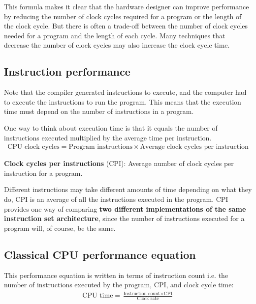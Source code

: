 \documentclass[10pt,a4paper]{article}
\begin{document}
This formula makes it clear that the hardware designer can improve performance by reducing the
number of clock cycles required for a program or the length of the clock cycle. But there is often a
trade-off between the number of clock cycles needed for a program and the length of each cycle. Many
techniques that decrease the number of clock cycles may also increase the clock cycle time.

\subsection{Instruction performance}

Note that the compiler generated instructions to execute, and the computer had to execute the
instructions to run the program. This means that the execution time must depend on the number of
instructions in a program. 

One way to think about execution time is that it equals the number of instructions executed
multiplied by the average time per instruction.
\begin{align*}
    \text{CPU clock cycles} = \text{Program instructions} \times \text{Average clock cycles per instruction}
\end{align*} 

\begin{tcolorbox}[breakable,colback=white]
    \textbf{Clock cycles per instructions} (CPI): Average number of clock cycles per instruction for
    a program.
\end{tcolorbox}

Different instructions may take different amounts of time depending on what they do, CPI is an
average of all the instructions executed in the program. CPI provides one way of comparing \textbf{two
different implementations of the same instruction set architecture}, since the number of
instructions executed for a program will, of course, be the same.

\pagebreak

\subsection{Classical CPU performance equation}

This performance equation is written in terms of instruction count i.e. the number of instructions
executed by the program, CPI, and clock cycle time:
\begin{align*}
    \text{CPU time} = \frac{\text{Instruction count}\times \text{CPI}}{\text{Clock rate}}
\end{align*}
\end{document}
